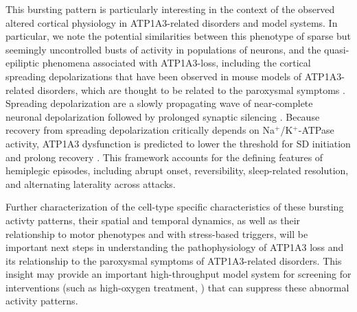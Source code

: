 This bursting pattern is particularly interesting in the context of the observed altered cortical physiology in ATP1A3-related disorders and model systems. 
In particular, we note the potential similarities between this phenotype of sparse but seemingly uncontrolled busts of activity in populations of neurons, and the quasi-epiliptic phenomena associated with ATP1A3-loss, including the cortical spreading depolarizations that have been observed in mouse models of ATP1A3-related disorders, which are thought to be related to the paroxysmal symptoms  \citep{Hunanyan2014, Balestrino1999}.
Spreading depolarization are a slowly propagating wave of near-complete neuronal depolarization followed by prolonged synaptic silencing \citep{Dreier2011}.
Because recovery from spreading depolarization critically depends on Na$^+$/K$^+$-ATPase activity, ATP1A3 dysfunction is predicted to lower the threshold for SD initiation and prolong recovery \citep{Hunanyan2014, Balestrino1999}.
This framework accounts for the defining features of hemiplegic episodes, including abrupt onset, reversibility, sleep-related resolution, and alternating laterality across attacks.
 
Further characterization of the cell-type specific characteristics of these bursting activty patterns, their spatial and temporal dynamics, as well as their relationship to motor phenotypes and with stress-based triggers, will be important next steps in understanding the pathophysiology of ATP1A3 loss and its relationship to the paroxysmal symptoms of ATP1A3-related disorders.
This insight may provide an important high-throughput model system for screening for interventions (such as high-oxygen treatment, \citealp{Papadopoulou2023_MD}) that can suppress these abnormal activity patterns. 
